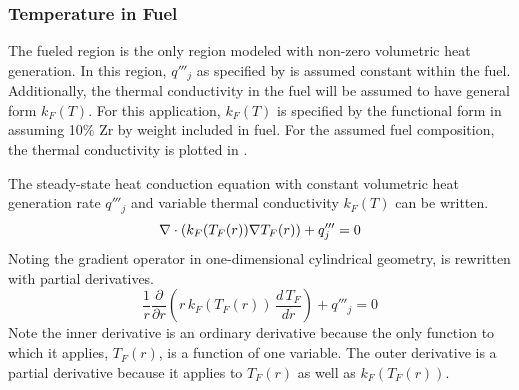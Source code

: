     \subsubsection{Temperature in Fuel}
      The fueled region is the only region modeled with non-zero volumetric heat
      generation. In this region, $q'''_j$ as specified by 
       is assumed constant within the fuel. 
      Additionally, the thermal conductivity in the fuel will be assumed to have
      general form $k_F(T)$. For this application, $k_F(T)$ is specified by the
      functional form in \cite{fuelProp} assuming 10\% Zr by weight included in
      fuel. For the assumed fuel composition, the thermal conductivity is
      plotted in .

      The steady-state heat conduction equation with constant volumetric heat
      generation rate $q'''_j$ and variable thermal conductivity $k_F(T)$ can be
      written.
      \begin{equation}
        \label{eq:conduction_fuel}
        \mathbf{\nabla} \cdot (k_F(T_F(r)) \mathbf{\nabla} T_F(r)) + q'''_j = 0
      \end{equation}
      Noting the gradient operator in one-dimensional cylindrical geometry,
       is rewritten with partial derivatives.
      \begin{equation}
        \label{eq:conduction_fuel_cylindrical}
        \frac{1}{r} \frac{\partial}{\partial r} \left( r \, k_F(T_F(r)) \, 
          \frac{d \, T_F}{dr} \right) + q'''_j = 0
      \end{equation}
      Note the inner derivative is an ordinary derivative because the only
      function to which it applies, $T_F(r)$, is a function of one variable. The
      outer derivative is a partial derivative because it applies to $T_F(r)$ as
      well as $k_F(T_F(r))$.

